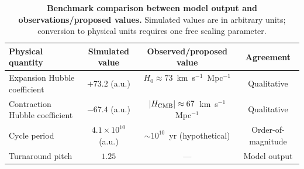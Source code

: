 \documentclass[12pt,a4paper]{article}
\begin{document}
\begin{table}[htbp]
\centering
\caption{\textbf{Benchmark comparison between model output and observations/proposed values.} Simulated values are in arbitrary units; conversion to physical units requires one free scaling parameter.}
\label{tab:1}
\small
\begin{tabularx}{\textwidth}{@{}Xccc@{}}
\toprule
Physical quantity & Simulated value & Observed/proposed value & Agreement \\
\midrule
Expansion Hubble coefficient & $+73.2$ (a.u.) & $H_0\approx 73$~km~s$^{-1}$~Mpc$^{-1}$~\cite{riess2016} & Qualitative \\
Contraction Hubble coefficient & $-67.4$ (a.u.) & $|H_{\rm CMB}|\approx 67$~km~s$^{-1}$~Mpc$^{-1}$~\cite{planck2020} & Qualitative \\
Cycle period & $4.1\times 10^{10}$ (a.u.) & $\sim 10^{10}$~yr (hypothetical) & Order-of-magnitude \\
Turnaround pitch & $1.25$ & --- & Model output \\
\bottomrule
\end{tabularx}
\end{table}
\end{document}
